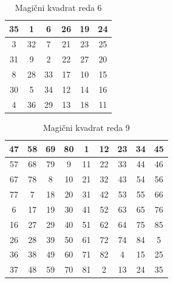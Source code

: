 \documentclass[a4paper,12pt]{article}
\newenvironment{magic}[3]{\begin{table}[!ht]
   \centering
   \caption{#1}
   \label{#2}
   \large
   \begin{tabular}{|*{#3}{c|}}
   \hline}{ \end{tabular}
   \normalsize
\end{table}}
\theoremstyle{definition}
\theoremstyle{plain}
\begin{document}
\begin{magic}{Magični kvadrat reda 6}{table:mag6}{6}
   35 &  1 &  6 & 26 & 19 & 24 \\\hline
    3 & 32 &  7 & 21 & 23 & 25 \\\hline
   31 &  9 &  2 & 22 & 27 & 20 \\\hline
    8 & 28 & 33 & 17 & 10 & 15 \\\hline
   30 &  5 & 34 & 12 & 14 & 16 \\\hline
    4 & 36 & 29 & 13 & 18 & 11 \\\hline
\end{magic}

\begin{magic}{Magični kvadrat reda 9}{table:mag9}{9}
   47 & 58 & 69 & 80 &  1 & 12 & 23 & 34 & 45 \\\hline
   57 & 68 & 79 &  9 & 11 & 22 & 33 & 44 & 46 \\\hline
   67 & 78 &  8 & 10 & 21 & 32 & 43 & 54 & 56 \\\hline
   77 &  7 & 18 & 20 & 31 & 42 & 53 & 55 & 66 \\\hline
    6 & 17 & 19 & 30 & 41 & 52 & 63 & 65 & 76 \\\hline
   16 & 27 & 29 & 40 & 51 & 62 & 64 & 75 & 85 \\\hline
   26 & 28 & 39 & 50 & 61 & 72 & 74 & 84 &  5 \\\hline
   36 & 38 & 49 & 60 & 71 & 82 &  4 & 15 &   25 \\\hline
   37 & 48 & 59 & 70 & 81 &  2   & 13 & 24 & 35 \\\hline
\end{magic}

\newpage




\end{document}
